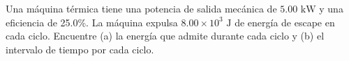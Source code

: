 \item Una máquina térmica tiene una potencia de salida mecánica de $5.00\text{ kW}$ y una eficiencia de 25.0\%. La máquina expulsa $8.00 \times 10^3\text{ J}$ de energía de escape en cada ciclo. Encuentre (a) la energía que admite durante cada ciclo y (b) el intervalo de tiempo por cada ciclo.
